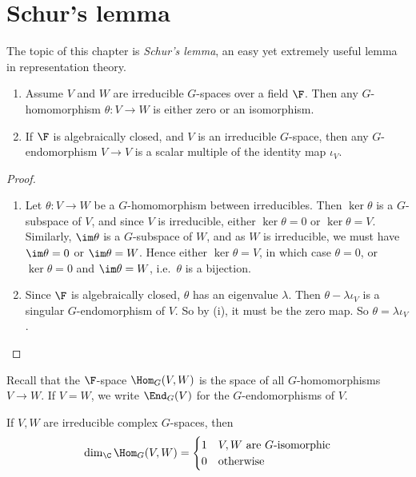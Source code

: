 \documentclass[a4paper]{article}
\begin{document}
\section{Schur's lemma}
The topic of this chapter is \emph{Schur's lemma}, an easy yet extremely useful lemma in representation theory.

\begin{thm}\leavevmode
  \begin{enumerate}
    \item Assume $V$ and $W$ are irreducible $G$-spaces over a field $\F$. Then any $G$-homomorphism $\theta: V \to W$ is either zero or an isomorphism.
    \item If $\F$ is algebraically closed, and $V$ is an irreducible $G$-space, then any $G$-endomorphism $V \to V$ is a scalar multiple of the identity map $\iota_V$.
  \end{enumerate}
\end{thm}

\begin{proof}\leavevmode
  \begin{enumerate}
    \item Let $\theta: V \to W$ be a $G$-homomorphism between irreducibles. Then $\ker \theta$ is a $G$-subspace of $V$, and since $V$ is irreducible, either $\ker \theta = 0$ or $\ker \theta = V$. Similarly, $\im \theta$ is a $G$-subspace of $W$, and as $W$ is irreducible, we must have $\im \theta = 0$ or $\im \theta = W$. Hence either $\ker \theta = V$, in which case $\theta = 0$, or $\ker \theta = 0$ and $\im \theta = W$, i.e.\ $\theta$ is a bijection.
    \item Since $\F$ is algebraically closed, $\theta$ has an eigenvalue $\lambda$. Then $\theta - \lambda \iota_V$ is a singular $G$-endomorphism of $V$. So by (i), it must be the zero map. So $\theta = \lambda \iota_V$.
  \end{enumerate}
\end{proof}

Recall that the $\F$-space $\Hom_G(V, W)$ is the space of all $G$-homomorphisms $V \to W$. If $V = W$, we write $\End_G(V)$ for the $G$-endomorphisms of $V$.

\begin{cor}
  If $V, W$ are irreducible complex $G$-spaces, then
  \[
    \dim_\C \Hom_G(V, W) =
    \begin{cases}
      1 & V, W\text{ are $G$-isomorphic}\\
      0 & \text{otherwise}
    \end{cases}
  \]
\end{cor}
\end{document}
